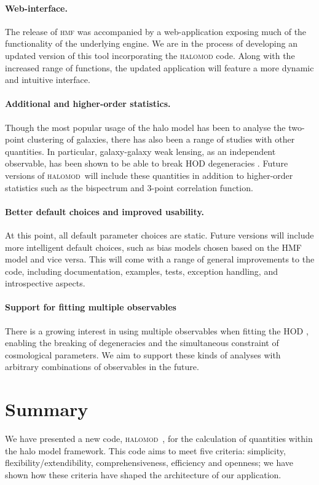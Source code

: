 \documentclass[5p]{elsarticle}
\newcommand{\halomod}{\textsc{halomod}}
\begin{document}
\paragraph*{Web-interface. }
The release of \textsc{hmf} was accompanied by a web-application exposing much of the functionality of the underlying engine. We are in the process of developing an updated version of this tool incorporating the \textsc{halomod} code. Along with the increased range of functions, the updated application will feature a more dynamic and intuitive interface. 

\paragraph*{Additional and higher-order statistics. }
Though the most popular usage of the halo model has been to analyse the two-point clustering of galaxies, there has also been a range of studies with other quantities. In particular, galaxy-galaxy weak lensing, as an independent observable, has been shown to be able to break HOD degeneracies \citep{Leauthaud2012}. Future versions of \halomod\  will include these quantities in addition to higher-order statistics such as the bispectrum and 3-point correlation function. 

\paragraph*{Better default choices and improved usability. }
At this point, all default parameter choices are static. Future versions will include more intelligent default choices, such as bias models chosen based on the HMF model and vice versa. This will come with a range of general improvements to the code, including documentation, examples, tests, exception handling, and introspective aspects.

\paragraph*{Support for fitting  multiple observables}
There is a growing interest in using multiple observables when fitting the HOD \citep{Leauthaud2011,Leauthaud2012,Tinker2013}, enabling the breaking of degeneracies and the simultaneous constraint of cosmological parameters. We aim to support these kinds of analyses with arbitrary combinations of observables in the future.

\section{Summary}
\label{sec:summary}
We have presented a new code, \halomod\  ,  for the calculation of quantities within the halo model framework. This code aims to meet five criteria: simplicity, flexibility/extendibility, comprehensiveness, efficiency and openness; we have shown how these criteria have shaped the architecture of our application.
\end{document}
